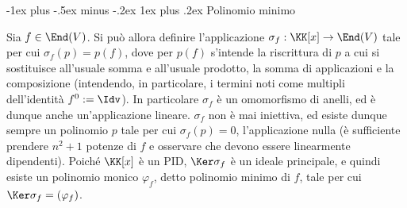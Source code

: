 \documentclass[10pt,landscape]{article}
\makeatletter
\renewcommand{\subsubsection}{\@startsection{subsubsection}{3}{0mm}%
	{-1ex plus -.5ex minus -.2ex}%
	{1ex plus .2ex}%
	{\normalfont\small\bfseries}}
\makeatother
\begin{document}
\begin{multicols}{3}
		\subsubsection{Polinomio minimo}
		
		Sia $f \in \End(V)$. Si può allora definire l'applicazione $\sigma_f : \KK[x] \to \End(V)$
		tale per cui $\sigma_f(p) = p(f)$, dove per $p(f)$ s'intende
		la riscrittura di $p$ a cui si sostituisce all'usuale
		somma e all'usuale prodotto, la somma di applicazioni
		e la composizione (intendendo, in particolare, i termini
		noti come multipli dell'identità $f^0 := \Idv$). In particolare $\sigma_f$ è un omomorfismo di anelli,
		ed è dunque anche un'applicazione lineare. $\sigma_f$ non
		è mai iniettiva, ed esiste dunque sempre un polinomio $p$
		tale per cui $\sigma_f(p) = 0$, l'applicazione nulla (è
		sufficiente prendere $n^2+1$ potenze di $f$ e osservare
		che devono essere linearmente dipendenti). Poiché
		$\KK[x]$ è un PID, $\Ker \sigma_f$ è un ideale principale,
		e quindi esiste un polinomio monico $\varphi_f$, detto
		polinomio minimo di $f$, tale per cui
		$\Ker \sigma_f = (\varphi_f)$.
		

\end{multicols}
\end{document}
